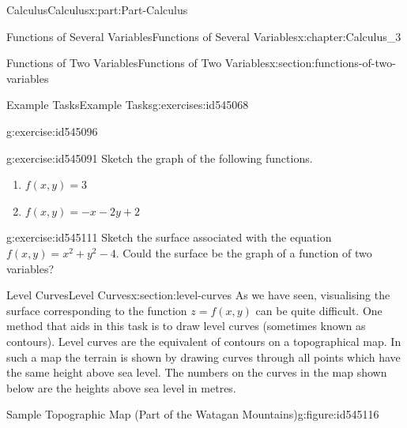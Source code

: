 \documentclass[oneside,10pt,]{book}
\numberwithin{equation}{section}
\begin{document}
\begin{partptx}{Calculus}{}{Calculus}{}{}{x:part:Part-Calculus}
\begin{chapterptx}{Functions of Several Variables}{}{Functions of Several Variables}{}{}{x:chapter:Calculus_3}
\begin{sectionptx}{Functions of Two Variables}{}{Functions of Two Variables}{}{}{x:section:functions-of-two-variables}
\begin{exercises-subsection-numberless}{Example Tasks}{}{Example Tasks}{}{}{g:exercises:id545068}
\begin{divisionexercise}{1}{}{}{g:exercise:id545096}
\end{divisionexercise}%
\begin{divisionexercise}{2}{}{}{g:exercise:id545091}%
Sketch the graph of the following functions.%
\par
%
\begin{enumerate}[label=\alph*.]
\item{}\(\displaystyle f(x,y)=3\)%
\item{}\(\displaystyle f(x,y)=-x-2y+2\)%
\end{enumerate}
%
\end{divisionexercise}%
\begin{divisionexercise}{3}{}{}{g:exercise:id545111}%
Sketch the surface associated with the equation \(f(x,y)=x^2+y^2-4\). Could the surface be the graph of a function of two variables?%
\end{divisionexercise}%
\end{exercises-subsection-numberless}
\end{sectionptx}
%
%
\typeout{************************************************}
\typeout{************************************************}
%
\begin{sectionptx}{Level Curves}{}{Level Curves}{}{}{x:section:level-curves}
As we have seen, visualising the surface corresponding to the function \(z=f(x,y)\) can be quite difficult. One method that aids in this task is to draw level curves (sometimes known as contours). Level curves are the equivalent of contours on a topographical map. In such a map the terrain is shown by drawing curves through all points which have the same height above sea level. The numbers on the curves in the map shown below are the heights above sea level in metres. \begin{figureptx}{Sample Topographic Map (Part of the Watagan Mountains)}{g:figure:id545116}{}%
\begin{image}{0.125}{0.75}{0.125}%

\end{image}
\end{figureptx}
\end{sectionptx}
\end{chapterptx}
\end{partptx}
\end{document}
